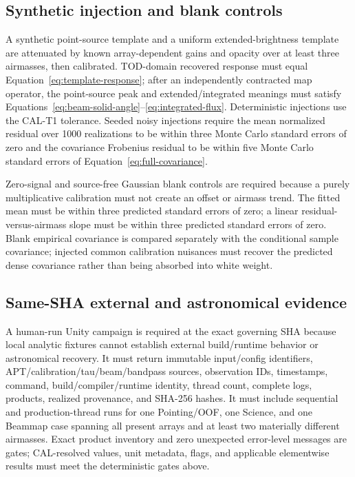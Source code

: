 \documentclass[11pt]{article}
\begin{document}
\subsection{Synthetic injection and blank controls}

A synthetic point-source template and a uniform extended-brightness template
are attenuated by known array-dependent gains and opacity over at least three
airmasses, then calibrated.  TOD-domain recovered response must equal
Equation~\eqref{eq:template-response}; after an independently contracted map
operator, the point-source peak and extended/integrated meanings must satisfy
Equations~\eqref{eq:beam-solid-angle}--\eqref{eq:integrated-flux}.  Deterministic
injections use the CAL-T1 tolerance.  Seeded noisy injections require the
mean normalized residual over 1000 realizations to be within three Monte Carlo
standard errors of zero and the covariance Frobenius residual to be within
five Monte Carlo standard errors of Equation~\eqref{eq:full-covariance}.

Zero-signal and source-free Gaussian blank controls are required because a
purely multiplicative calibration must not create an offset or airmass trend.
The fitted mean must be within three predicted standard errors of zero; a
linear residual-versus-airmass slope must be within three predicted standard
errors of zero.  Blank empirical covariance is compared separately with the
conditional sample covariance; injected common calibration nuisances must
recover the predicted dense covariance rather than being absorbed into white
weight.

\subsection{Same-SHA external and astronomical evidence}

A human-run Unity campaign is required at the exact governing SHA because
local analytic fixtures cannot establish external build/runtime behavior or
astronomical recovery.  It must return immutable input/config identifiers,
APT/calibration/tau/beam/bandpass sources, observation IDs, timestamps,
command, build/compiler/runtime identity, thread count, complete logs,
products, realized provenance, and SHA-256 hashes.  It must include sequential
and production-thread runs for one Pointing/OOF, one Science, and one Beammap
case spanning all present arrays and at least two materially different
airmasses.  Exact product inventory and zero unexpected error-level messages
are gates; CAL-resolved values, unit metadata, flags, and applicable
elementwise results must meet the deterministic gates above.
\end{document}
